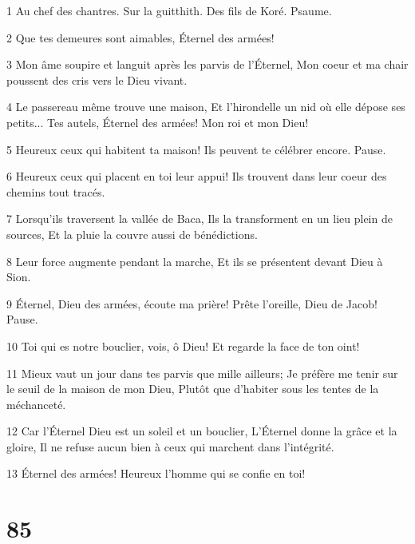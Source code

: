 \par 1 Au chef des chantres. Sur la guitthith. Des fils de Koré. Psaume.
\par 2 Que tes demeures sont aimables, Éternel des armées!
\par 3 Mon âme soupire et languit après les parvis de l'Éternel, Mon coeur et ma chair poussent des cris vers le Dieu vivant.
\par 4 Le passereau même trouve une maison, Et l'hirondelle un nid où elle dépose ses petits... Tes autels, Éternel des armées! Mon roi et mon Dieu!
\par 5 Heureux ceux qui habitent ta maison! Ils peuvent te célébrer encore. Pause.
\par 6 Heureux ceux qui placent en toi leur appui! Ils trouvent dans leur coeur des chemins tout tracés.
\par 7 Lorsqu'ils traversent la vallée de Baca, Ils la transforment en un lieu plein de sources, Et la pluie la couvre aussi de bénédictions.
\par 8 Leur force augmente pendant la marche, Et ils se présentent devant Dieu à Sion.
\par 9 Éternel, Dieu des armées, écoute ma prière! Prête l'oreille, Dieu de Jacob! Pause.
\par 10 Toi qui es notre bouclier, vois, ô Dieu! Et regarde la face de ton oint!
\par 11 Mieux vaut un jour dans tes parvis que mille ailleurs; Je préfère me tenir sur le seuil de la maison de mon Dieu, Plutôt que d'habiter sous les tentes de la méchanceté.
\par 12 Car l'Éternel Dieu est un soleil et un bouclier, L'Éternel donne la grâce et la gloire, Il ne refuse aucun bien à ceux qui marchent dans l'intégrité.
\par 13 Éternel des armées! Heureux l'homme qui se confie en toi!

\chapter{85}


